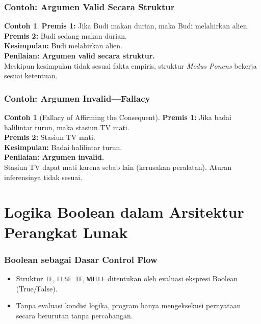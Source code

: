 \documentclass[handout]{beamer}
\theoremstyle{definition}
\theoremstyle{example}
\newtheorem{contoh}[theorem]{Contoh}
\begin{document}
\begin{frame}
\frametitle{Contoh: Argumen Valid Secara Struktur}
\begin{contoh}
\textbf{Premis 1:} Jika Budi makan durian, maka Budi melahirkan alien.\\
\textbf{Premis 2:} Budi sedang makan durian.\\
\textbf{Kesimpulan:} Budi melahirkan alien.\\
\vspace{0.3cm}
\textbf{Penilaian: Argumen valid secara struktur.}\\
Meskipun kesimpulan tidak sesuai fakta empiris, struktur \textit{Modus Ponens} bekerja sesuai ketentuan.
\end{contoh}
\end{frame}

\begin{frame}
\frametitle{Contoh: Argumen Invalid---Fallacy}
\begin{contoh}[Fallacy of Affirming the Consequent]
\textbf{Premis 1:} Jika badai halilintar turun, maka stasiun TV mati.\\
\textbf{Premis 2:} Stasiun TV mati.\\
\textbf{Kesimpulan:} Badai halilintar turun.\\
\vspace{0.3cm}
\textbf{Penilaian: Argumen invalid.}\\
Stasiun TV dapat mati karena sebab lain (kerusakan peralatan). Aturan inferensinya tidak sesuai.
\end{contoh}
\end{frame}

\section{Logika Boolean dalam Arsitektur Perangkat Lunak}

\begin{frame}
\frametitle{Boolean sebagai Dasar Control Flow}
\begin{itemize}
  \item Struktur \texttt{IF}, \texttt{ELSE IF}, \texttt{WHILE} ditentukan oleh evaluasi ekspresi Boolean (True/False).
  \item Tanpa evaluasi kondisi logika, program hanya mengeksekusi pernyataan secara berurutan tanpa percabangan.
\end{itemize}
\end{frame}
\end{document}
